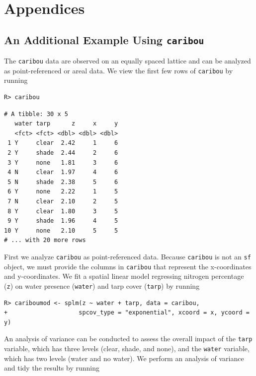 \documentclass{article}
\begin{document}
\newpage

\hypertarget{appendices}{%
\section*{Appendices}\label{appendices}}

\renewcommand{\thesubsection}{\Alph{subsection}}

\hypertarget{app:caribou}{%
\subsection{\texorpdfstring{An Additional Example Using
\texttt{caribou}}{An Additional Example Using caribou}}\label{app:caribou}}

The \texttt{caribou} data are observed on an equally spaced lattice and
can be analyzed as point-referenced or areal data. We view the first few
rows of \texttt{caribou} by running

\begin{verbatim}
R> caribou
\end{verbatim}

\begin{verbatim}
# A tibble: 30 x 5
   water tarp      z     x     y
   <fct> <fct> <dbl> <dbl> <dbl>
 1 Y     clear  2.42     1     6
 2 Y     shade  2.44     2     6
 3 Y     none   1.81     3     6
 4 N     clear  1.97     4     6
 5 N     shade  2.38     5     6
 6 Y     none   2.22     1     5
 7 N     clear  2.10     2     5
 8 Y     clear  1.80     3     5
 9 Y     shade  1.96     4     5
10 Y     none   2.10     5     5
# ... with 20 more rows
\end{verbatim}

First we analyze \texttt{caribou} as point-referenced data. Because
\texttt{caribou} is not an \texttt{sf} object, we must provide the
columns in \texttt{caribou} that represent the x-coordinates and
y-coordinates. We fit a spatial linear model regressing nitrogen
percentage (\texttt{z}) on water presence (\texttt{water}) and tarp
cover (\texttt{tarp}) by running

\begin{verbatim}
R> cariboumod <- splm(z ~ water + tarp, data = caribou,
+                    spcov_type = "exponential", xcoord = x, ycoord = y)
\end{verbatim}

An analysis of variance can be conducted to assess the overall impact of
the \texttt{tarp} variable, which has three levels (clear, shade, and
none), and the \texttt{water} variable, which has two levels (water and
no water). We perform an analysis of variance and tidy the results by
running
\end{document}
